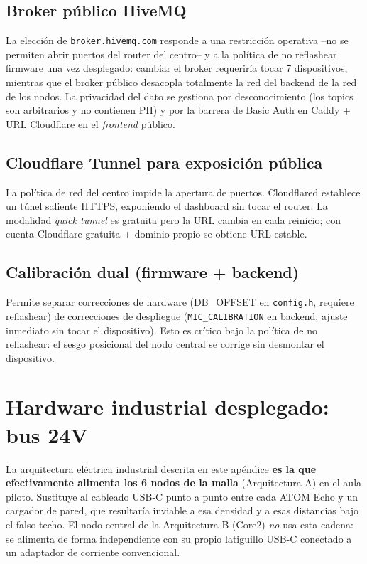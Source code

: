 \documentclass[11pt,a4paper,openany]{report}
\begin{document}
\section{Broker p\'ublico HiveMQ}
La elecci\'on de \texttt{broker.hivemq.com} responde a una restricci\'on operativa --no se permiten abrir puertos del router del centro-- y a la pol\'itica de no reflashear firmware una vez desplegado: cambiar el broker requerir\'ia tocar 7 dispositivos, mientras que el broker p\'ublico desacopla totalmente la red del backend de la red de los nodos. La privacidad del dato se gestiona por desconocimiento (los topics son arbitrarios y no contienen PII) y por la barrera de Basic Auth en Caddy + URL Cloudflare en el \emph{frontend} p\'ublico.

\section{Cloudflare Tunnel para exposici\'on p\'ublica}
La pol\'itica de red del centro impide la apertura de puertos. Cloudflared establece un t\'unel saliente HTTPS, exponiendo el dashboard sin tocar el router. La modalidad \emph{quick tunnel} es gratuita pero la URL cambia en cada reinicio; con cuenta Cloudflare gratuita + dominio propio se obtiene URL estable.

\section{Calibraci\'on dual (firmware + backend)}
Permite separar correcciones de hardware (DB\_OFFSET en \texttt{config.h}, requiere reflashear) de correcciones de despliegue (\texttt{MIC\_CALIBRATION} en backend, ajuste inmediato sin tocar el dispositivo). Esto es cr\'itico bajo la pol\'itica de no reflashear: el sesgo posicional del nodo central se corrige sin desmontar el dispositivo.

\appendix
\renewcommand{\chaptername}{Ap\'endice}

\chapter{Hardware industrial desplegado: bus 24V}
\label{ap:bus24v}

La arquitectura el\'ectrica industrial descrita en este ap\'endice \textbf{es la que efectivamente alimenta los 6 nodos de la malla} (Arquitectura A) en el aula piloto. Sustituye al cableado USB-C punto a punto entre cada ATOM Echo y un cargador de pared, que resultar\'ia inviable a esa densidad y a esas distancias bajo el falso techo. El nodo central de la Arquitectura B (Core2) \emph{no} usa esta cadena: se alimenta de forma independiente con su propio latiguillo USB-C conectado a un adaptador de corriente convencional.
\end{document}
